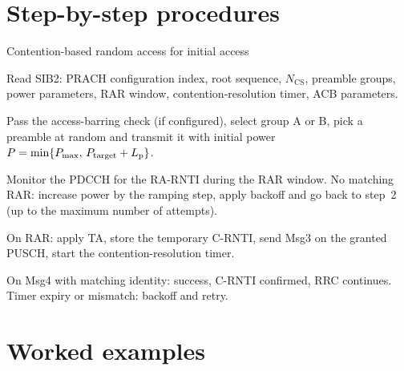 \documentclass[11pt,a4paper]{article}
\begin{document}
\section{Step-by-step procedures}
\begin{procedurebox}{Contention-based random access for initial access}\label{proc:cbra}
\begin{steps}
  \item Read SIB2: PRACH configuration index, root sequence, $N_{\mathrm{CS}}$, preamble groups, power
        parameters, RAR window, contention-resolution timer, ACB parameters.
  \item Pass the access-barring check (if configured), select group A or B, pick a preamble at random and
        transmit it with initial power $P = \min\{P_{\max},\,P_{\mathrm{target}} + L_{\mathrm{p}}\}$.
  \item Monitor the PDCCH for the RA-RNTI during the RAR window. No matching RAR: increase power by the
        ramping step, apply backoff and go back to step~2 (up to the maximum number of attempts).
  \item On RAR: apply TA, store the temporary C-RNTI, send Msg3 on the granted PUSCH, start the
        contention-resolution timer.
  \item On Msg4 with matching identity: success, C-RNTI confirmed, RRC continues. Timer expiry or
        mismatch: backoff and retry.
\end{steps}
\end{procedurebox}

\begin{acnfigure}
  \caption{Contention-based (4-step) random access (\cref{proc:cbra}).}
  \label{fig:cbra}
\end{acnfigure}

\begin{acnfigure}
  \caption{Contention-free random access, e.g.\ at handover.}
  \label{fig:cfra}
\end{acnfigure}

\begin{acnfigure}
  \caption{NR 2-step random access (Release 16).}
  \label{fig:twostep}
\end{acnfigure}

\section{Worked examples}
\end{document}
